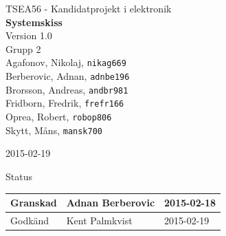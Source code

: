 \documentclass[11pt]{article}
\date{}
\begin{document}
\begin{titlepage}
\begin{center}
TSEA56 - Kandidatprojekt i elektronik \\[0.5in] 
{\Large\bfseries Systemskiss}\\
%
\vspace{4\baselineskip}
%
Version 1.0\\
\vspace{2\baselineskip}
%
Grupp 2 \\
Agafonov, Nikolaj, 
\texttt{nikag669}
\\
Berberovic, Adnan, 
\texttt{adnbe196}
\\
Brorsson, Andreas, 
\texttt{andbr981}
\\
Fridborn, Fredrik, 
\texttt{frefr166}
\\
Oprea, Robert, 
\texttt{robop806}
\\
Skytt, Måns, 
\texttt{mansk700}

\vspace{2\baselineskip}
2015-02-19

\vspace{19\baselineskip}
Status
\begin{longtable}{|l|l|l|} \hline

Granskad &
Adnan Berberovic &
2015-02-18 \\ \hline
Godkänd &
Kent Palmkvist &
2015-02-19 \\ \hline
 
\end{longtable}

\end{center}
\end{titlepage}
\end{document}
